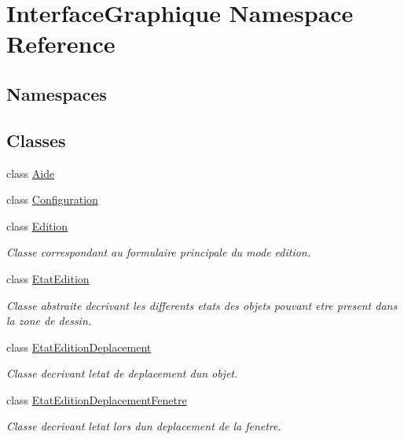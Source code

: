 \hypertarget{namespace_interface_graphique}{}\section{Interface\+Graphique Namespace Reference}
\label{namespace_interface_graphique}
\subsection*{Namespaces}
\begin{DoxyCompactItemize}
\end{DoxyCompactItemize}
\subsection*{Classes}
\begin{DoxyCompactItemize}
\item 
class \hyperlink{class_interface_graphique_1_1_aide}{Aide}
\item 
class \hyperlink{class_interface_graphique_1_1_configuration}{Configuration}
\item 
class \hyperlink{class_interface_graphique_1_1_edition}{Edition}
\begin{DoxyCompactList}\small\item\em Classe correspondant au formulaire principale du mode edition. \end{DoxyCompactList}\item 
class \hyperlink{class_interface_graphique_1_1_etat_edition}{Etat\+Edition}
\begin{DoxyCompactList}\small\item\em Classe abstraite decrivant les differents etats des objets pouvant etre present dans la zone de dessin. \end{DoxyCompactList}\item 
class \hyperlink{class_interface_graphique_1_1_etat_edition_deplacement}{Etat\+Edition\+Deplacement}
\begin{DoxyCompactList}\small\item\em Classe decrivant l\textquotesingle{}etat de deplacement d\textquotesingle{}un objet. \end{DoxyCompactList}\item 
class \hyperlink{class_interface_graphique_1_1_etat_edition_deplacement_fenetre}{Etat\+Edition\+Deplacement\+Fenetre}
\begin{DoxyCompactList}\small\item\em Classe decrivant l\textquotesingle{}etat lors d\textquotesingle{}un deplacement de la fenetre. \end{DoxyCompactList}\item 

\end{DoxyCompactItemize}
